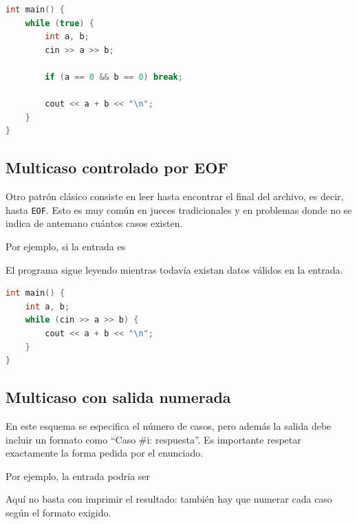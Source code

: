 \begin{lstlisting}[language=C++]
int main() {
    while (true) {
        int a, b;
        cin >> a >> b;

        if (a == 0 && b == 0) break;

        cout << a + b << "\n";
    }
}
\end{lstlisting}

\subsection{Multicaso controlado por EOF}

Otro patrón clásico consiste en leer hasta encontrar el final del archivo, es decir, hasta \texttt{EOF}. Esto es muy común en jueces tradicionales y en problemas donde no se indica de antemano cuántos casos existen.

Por ejemplo, si la entrada es


El programa sigue leyendo mientras todavía existan datos válidos en la entrada.

\begin{lstlisting}[language=C++]
int main() {
    int a, b;
    while (cin >> a >> b) {
        cout << a + b << "\n";
    }
}
\end{lstlisting}

\subsection{Multicaso con salida numerada}

En este esquema se especifica el número de casos, pero además la salida debe incluir un formato como ``Caso \#i: respuesta''. Es importante respetar exactamente la forma pedida por el enunciado.

Por ejemplo, la entrada podría ser


Aquí no basta con imprimir el resultado: también hay que numerar cada caso según el formato exigido.

